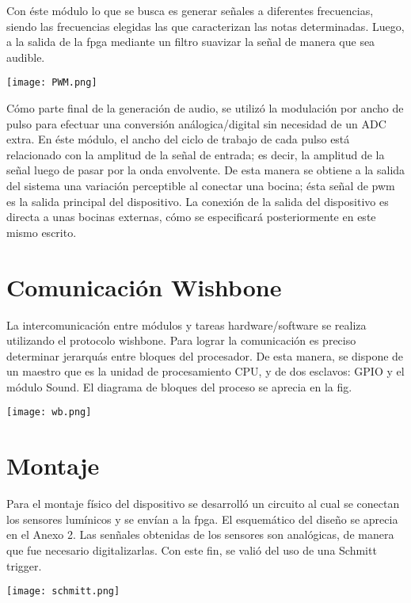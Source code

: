 \documentclass[12pt,journal]{IEEEtran}
\begin{document}
Con \'este m\'odulo lo que se busca es generar señales a diferentes frecuencias, siendo las frecuencias elegidas las que caracterizan las notas determinadas. Luego, a la salida de la fpga mediante un filtro suavizar la señal de manera que sea audible.

 \begin{center}
	\texttt{[image: PWM.png]}
\end{center}

C\'omo parte final de la generaci\'on de audio, se utiliz\'o la modulaci\'on por ancho de pulso para efectuar una conversi\'on an\'alogica/digital sin necesidad de un ADC extra. En \'este m\'odulo, el ancho del ciclo de trabajo de cada pulso est\'a relacionado con la amplitud de la señal de entrada; es decir, la amplitud de la señal luego de pasar por la onda envolvente. De esta manera se obtiene a la salida del sistema una variaci\'on perceptible al conectar una bocina; \'esta señal de pwm es la salida principal del dispositivo. La conexi\'on de la salida del dispositivo es directa a unas bocinas externas, c\'omo se especificar\'a posteriormente en este mismo escrito.

\section{Comunicaci\'on Wishbone}
La intercomunicaci\'on entre m\'odulos y tareas hardware/software se realiza utilizando el protocolo wishbone. Para lograr la comunicaci\'on es preciso determinar jerarqu\'as entre bloques del procesador. De esta manera, se dispone de un maestro que es la unidad de procesamiento CPU, y de dos esclavos: GPIO y el m\'odulo Sound. El diagrama de bloques del proceso se aprecia en la fig. 
\begin{center}
	\texttt{[image: wb.png]}
\end{center}

\section{Montaje}
Para el montaje f\'isico del dispositivo se desarroll\'o un circuito al cual se conectan los sensores lum\'inicos y se env\'ian a la fpga. El esquem\'atico del diseño se aprecia en el Anexo 2. Las sen\~nales obtenidas de los sensores son anal\'ogicas, de manera que fue necesario digitalizarlas. Con este fin, se vali\'o del uso de una Schmitt trigger.
\begin{center}
	\texttt{[image: schmitt.png]}
\end{center}
\end{document}
